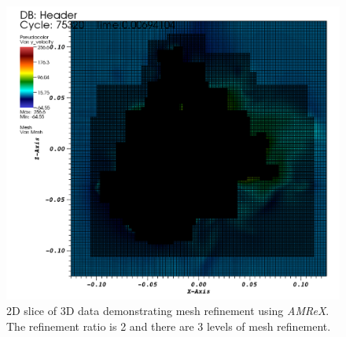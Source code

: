 \begin{figure}[h!]
\begin{center}
	\includegraphics[scale=.3]{figures/amr_example.png}
	\caption{2D slice of 3D data demonstrating mesh refinement using \textit{AMReX}. The refinement ratio is 2 and there are 3 levels of mesh refinement.} \label{amr_ex}
\end{center}
\end{figure}

